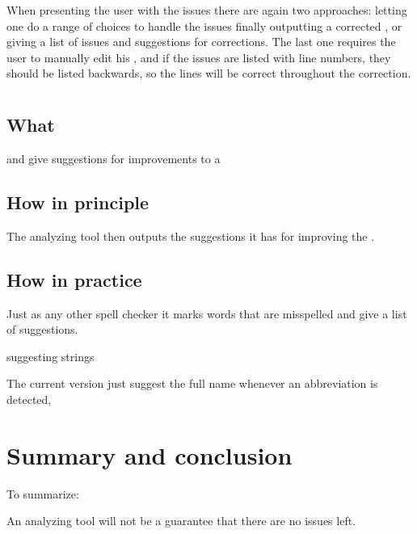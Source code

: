 When presenting the user with the issues there are again two
approaches: letting one do a range of choices to handle the issues
finally outputting a corrected , or giving a list of issues
and suggestions for corrections.  The last one requires the user to
manually edit his , and if the issues are listed with line
numbers, they should be listed backwards, so the lines will be correct
throughout the correction.


\section{\orangutan}

\subsection{What}
 and give suggestions for improvements to a

\subsection{How in principle}

The analyzing tool then outputs the suggestions it has for improving
the .

\subsection{How in practice}

Just as any other spell checker it marks words that are misspelled and
give a list of suggestions.

suggesting strings

The current version just suggest the full name whenever an
abbreviation is detected,

\section{Summary and conclusion}

To summarize:

An analyzing tool will not be a guarantee that there are no issues
left.
